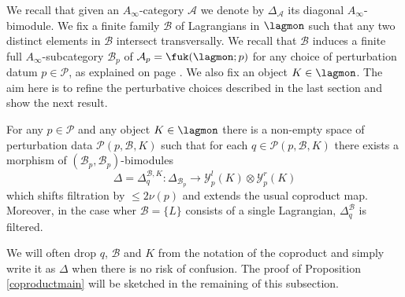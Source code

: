	We recall that given an $A_\infty$-category $\mathcal{A}$ we denote by $\Delta_\mathcal{A}$ its diagonal $A_\infty$-bimodule. %
	We fix a finite family $\mathcal{B}$ of Lagrangians in $\lagmon$ such that any two distinct elements in $\mathcal{B}$ intersect transversally. We recall that $\mathcal{B}$ induces a finite full $A_\infty$-subcategory $\mathcal{B}_p$ of $\mathcal{A}_p=\fuk(\lagmon;p)$ for any choice of perturbation datum $p\in \mathcal{P}$, as explained on page \pageref{sec:split-app}. We also fix an object $K\in \lagmon$. %
	The aim here is to refine the perturbative choices described in the last section and show the next result.
	\begin{prop}\label{coproductmain} For any $p\in \mathcal{P}$ and any object $K\in \lagmon$ there is a non-empty space of perturbation data $\mathcal{P}(p,\mathcal{B},K)$ such that for each $q\in  \mathcal{P}(p,\mathcal{B},K)$ there exists a morphism of $(\mathcal{B}_p,\mathcal{B}_p)$-bimodules $$\Delta=\Delta^{\mathcal{B},K}_q\colon \Delta_{\mathcal{B}_p}\to \mathcal{Y}_{p}^l(K)\otimes \mathcal{Y}_{p}^r(K)$$ which shifts filtration by $\leq 2\nu(p)$ and extends the usual coproduct map. Moreover, in the case wher $\mathcal{B}=\{L\}$ consists of a single Lagrangian, $\Delta^\mathcal{B}_q$ is filtered.%
	\end{prop}
	\noindent We will often drop $q$, $\mathcal{B}$ and $K$ from the notation of the coproduct and simply write it as $\Delta$ when there is no risk of confusion. The proof of Proposition \ref{coproductmain} will be sketched in the remaining of this subsection.
